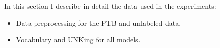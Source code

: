 In this section I describe in detail the data used in the experiments:
\begin{itemize}
  \item Data preprocessing for the PTB and unlabeled data.
  \item Vocabulary and UNKing for all models.
\end{itemize}
